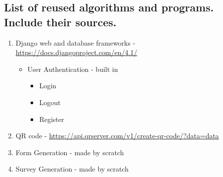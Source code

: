 \documentclass[letterpaper, 12 pt, conference]{ieeeconf}
\begin{document}
\subsection{List of reused algorithms and programs. Include their sources.}
\begin{enumerate}
   \item  Django web and database frameworks - \url{https://docs.djangoproject.com/en/4.1/}
   \begin{itemize}
     \item User Authentication - built in
     \begin{itemize}
         \item Login
         \item Logout
         \item Register
     \end{itemize}
   \end{itemize}
   \item QR code - \url{https://api.qrserver.com/v1/create-qr-code/?data=data}
    \item Form Generation - made by scratch
    \item Survey Generation - made by scratch
\end{enumerate}
\newpage
\end{document}
